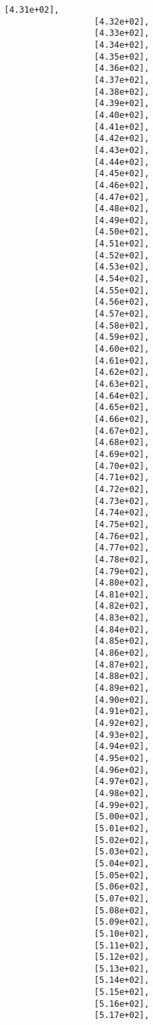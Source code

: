 \documentclass[11pt]{article}
\begin{document}
\begin{Verbatim}[commandchars=\\\{\}]
                  [4.31e+02],
                  [4.32e+02],
                  [4.33e+02],
                  [4.34e+02],
                  [4.35e+02],
                  [4.36e+02],
                  [4.37e+02],
                  [4.38e+02],
                  [4.39e+02],
                  [4.40e+02],
                  [4.41e+02],
                  [4.42e+02],
                  [4.43e+02],
                  [4.44e+02],
                  [4.45e+02],
                  [4.46e+02],
                  [4.47e+02],
                  [4.48e+02],
                  [4.49e+02],
                  [4.50e+02],
                  [4.51e+02],
                  [4.52e+02],
                  [4.53e+02],
                  [4.54e+02],
                  [4.55e+02],
                  [4.56e+02],
                  [4.57e+02],
                  [4.58e+02],
                  [4.59e+02],
                  [4.60e+02],
                  [4.61e+02],
                  [4.62e+02],
                  [4.63e+02],
                  [4.64e+02],
                  [4.65e+02],
                  [4.66e+02],
                  [4.67e+02],
                  [4.68e+02],
                  [4.69e+02],
                  [4.70e+02],
                  [4.71e+02],
                  [4.72e+02],
                  [4.73e+02],
                  [4.74e+02],
                  [4.75e+02],
                  [4.76e+02],
                  [4.77e+02],
                  [4.78e+02],
                  [4.79e+02],
                  [4.80e+02],
                  [4.81e+02],
                  [4.82e+02],
                  [4.83e+02],
                  [4.84e+02],
                  [4.85e+02],
                  [4.86e+02],
                  [4.87e+02],
                  [4.88e+02],
                  [4.89e+02],
                  [4.90e+02],
                  [4.91e+02],
                  [4.92e+02],
                  [4.93e+02],
                  [4.94e+02],
                  [4.95e+02],
                  [4.96e+02],
                  [4.97e+02],
                  [4.98e+02],
                  [4.99e+02],
                  [5.00e+02],
                  [5.01e+02],
                  [5.02e+02],
                  [5.03e+02],
                  [5.04e+02],
                  [5.05e+02],
                  [5.06e+02],
                  [5.07e+02],
                  [5.08e+02],
                  [5.09e+02],
                  [5.10e+02],
                  [5.11e+02],
                  [5.12e+02],
                  [5.13e+02],
                  [5.14e+02],
                  [5.15e+02],
                  [5.16e+02],
                  [5.17e+02],

\end{Verbatim}
\end{document}
